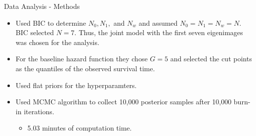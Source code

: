 \documentclass[
  ignorenonframetext,
]{beamer}
\providecommand{\tightlist}{%
  \setlength{\itemsep}{0pt}\setlength{\parskip}{0pt}}
\begin{document}
\begin{frame}{Data Analysis - Methods}
\protect\hypertarget{data-analysis---methods-1}{}
\begin{itemize}
\item
  Used BIC to determine \(𝑁_0,𝑁_1,\) and \(𝑁_𝑤\) and assumed
  \(𝑁_0=𝑁_1=𝑁_𝑤=𝑁\). BIC selected \(𝑁=7\). Thus, the joint model with
  the first seven eigenimages was chosen for the analysis.
\item
  For the baseline hazard function they chose \(𝐺=5\) and selected the
  cut points as the quantiles of the observed survival time.
\item
  Used flat priors for the hyperparamters.
\item
  Used MCMC algorithm to collect 10,000 posterior samples after 10,000
  burn-in iterations.

  \begin{itemize}
  \tightlist
  \item
    5.03 minutes of computation time.
  \end{itemize}
\end{itemize}
\end{frame}
\end{document}

